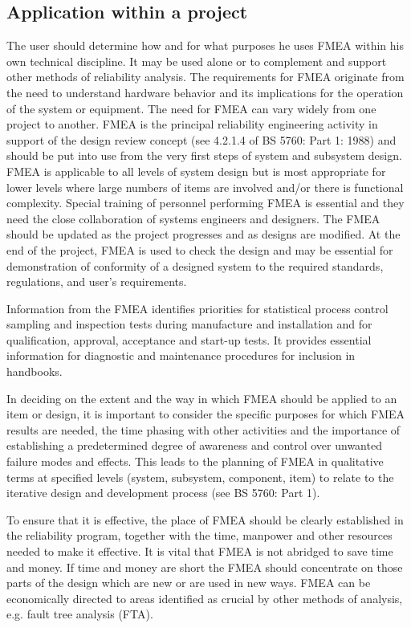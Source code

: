 \documentclass[./dissertation.tex]{subfiles}
\begin{document}
\subsection{Application within a project}
The user should determine how and for what purposes he uses FMEA within his own technical discipline. It may be used alone or to complement and support other methods of reliability analysis. The requirements for FMEA originate from the need to understand hardware behavior and its implications for the operation of the system or equipment. The need for FMEA can vary widely from one project to another. FMEA is the principal reliability engineering activity in support of the design review concept (see 4.2.1.4 of BS 5760: Part 1: 1988) and should be put into use from the very first steps of system and subsystem design. FMEA is applicable to all levels of system design but is most appropriate for lower levels where large numbers of items are involved and/or there is functional complexity. Special training of personnel performing FMEA is essential and they need the close collaboration of systems engineers and designers. The FMEA should be updated as the project progresses and as designs are modified. At the end of the project, FMEA is used to check the design and may be essential for demonstration of conformity of a designed system to the required standards, regulations, and user's requirements.

Information from the FMEA identifies priorities for statistical process control sampling and inspection tests during manufacture and installation and for qualification, approval, acceptance and start-up tests. It provides essential information for diagnostic and maintenance procedures for inclusion in handbooks.

In deciding on the extent and the way in which FMEA should be applied to an item or design, it is important to consider the specific purposes for which FMEA results are needed, the time phasing with other activities and the importance of establishing a predetermined degree of awareness and control over unwanted failure modes and effects. This leads to the planning of FMEA in qualitative terms at specified levels (system, subsystem, component, item) to relate to the iterative design and development process (see BS 5760: Part 1).

To ensure that it is effective, the place of FMEA should be clearly established in the reliability program, together with the time, manpower and other resources needed to make it effective. It is vital that FMEA is not abridged to save time and money. If time and money are short the FMEA should concentrate on those parts of the design which are new or are used in new ways. FMEA can be economically directed to areas identified as crucial by other methods of analysis, e.g. fault tree analysis (FTA).
\end{document}
